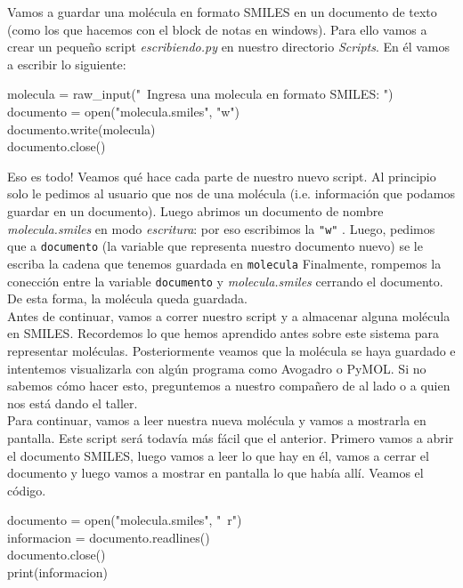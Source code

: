 \documentclass[10pt,letterpaper]{article}
\newcommand{\inlinecode}[1]{
\colorbox{light-gray}{\texttt{#1}}
}
\newenvironment{Code}
{
\begin{lrbox}{\selvestebox}%
\begin{minipage}{\dimexpr\columnwidth-2\fboxsep\relax}
\fontfamily{\ttdefault}\selectfont
}
{\end{minipage}\end{lrbox}%
\begin{center}
\colorbox{light-gray}{\usebox{\selvestebox}}
\end{center}
}
\begin{document}
Vamos a guardar una mol\'ecula en formato SMILES en un documento de texto (como los que hacemos con el block de notas en windows). Para ello vamos a crear un peque\~no script \textit{escribiendo.py} en nuestro directorio \textit{Scripts}. En \'el vamos a escribir lo siguiente:

\begin{Code}
molecula = raw\_input("\ \hspace{-2mm}Ingresa una molecula en formato SMILES: ")\\
documento = open("molecula.smiles", "w")\\
documento.write(molecula)\\
documento.close()
\end{Code}

Eso es todo! Veamos qu\'e hace cada parte de nuestro nuevo script. Al principio solo le pedimos al usuario que nos de una mol\'ecula (i.e. informaci\'on que podamos guardar en un documento). Luego abrimos un documento de nombre \textit{molecula.smiles} en modo \emph{escritura}: por eso escribimos la \inlinecode{"w"}. Luego, pedimos que a \inlinecode{documento} (la variable que representa nuestro documento nuevo) se le escriba la cadena que tenemos guardada en \inlinecode{molecula} Finalmente, rompemos la conecci\'on entre la variable \inlinecode{documento} y \textit{molecula.smiles} cerrando el documento. De esta forma, la mol\'ecula queda guardada.\\

Antes de continuar, vamos a correr nuestro script y a almacenar alguna mol\'ecula en SMILES. Recordemos lo que hemos aprendido antes sobre este sistema para representar mol\'eculas. Posteriormente veamos que la mol\'ecula se haya guardado e intentemos visualizarla con alg\'un programa como Avogadro o PyMOL. Si no sabemos c\'omo hacer esto, preguntemos a nuestro compa\~nero de al lado o a quien nos est\'a dando el taller.\\

Para continuar, vamos a leer nuestra nueva mol\'ecula y vamos a mostrarla en pantalla. Este script ser\'a todav\'ia m\'as f\'acil que el anterior. Primero vamos a abrir el documento SMILES, luego vamos a leer lo que hay en \'el, vamos a cerrar el documento y luego vamos a mostrar en pantalla lo que hab\'ia all\'i. Veamos el c\'odigo.

\begin{Code}
documento = open("molecula.smiles", "\ \hspace{-2mm}r")\\
informacion = documento.readlines()\\
documento.close()\\
print(informacion)
\end{Code}
\end{document}
